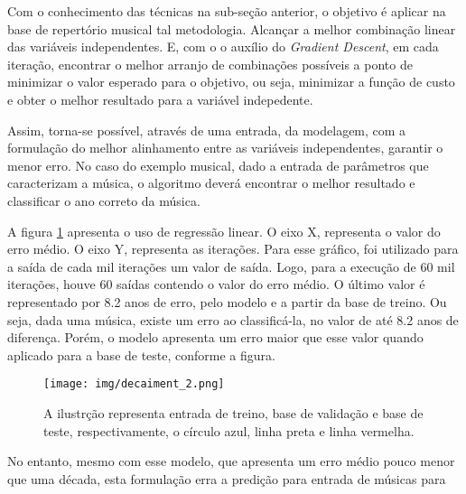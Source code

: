 \documentclass[journal]{IEEEtran}
\begin{document}
Com o conhecimento das técnicas na sub-seção anterior, o objetivo é aplicar na base de repertório musical tal metodologia. Alcançar a melhor combinação linear das variáveis independentes. E, com o o auxílio do \textit{Gradient Descent}, em cada iteração, encontrar o melhor arranjo de combinações possíveis a ponto de minimizar o valor esperado para o objetivo, ou seja, minimizar a função de custo e obter o melhor resultado para a variável indepedente. 

Assim, torna-se possível, através de uma entrada, da modelagem, com a formulação do melhor alinhamento entre as variáveis independentes, garantir o menor erro. No caso do exemplo musical, dado a entrada de parâmetros que caracterizam a música, o algoritmo deverá encontrar o melhor resultado e classificar o ano correto da música.

A figura \ref{fig:decaimento} apresenta o uso de regressão linear. O eixo X, representa o valor do erro médio. O eixo Y, representa as iterações. Para esse gráfico, foi utilizado para a saída de cada mil iterações um valor de saída. Logo, para a execução de 60 mil iterações, houve 60 saídas contendo o valor do erro médio. O último valor é representado por 8.2 anos de erro, pelo modelo e a partir da base de treino. Ou seja, dada uma música, existe um erro ao classificá-la, no valor de até 8.2 anos de diferença. Porém, o modelo apresenta um erro maior que esse valor quando aplicado para a base de teste, conforme a figura.

\begin{figure}[h]
\captionsetup{justification=centering}
\centering
\texttt{[image: img/decaiment\_2.png]} %
\caption{\small{A ilustrção representa entrada de treino, base de validação e base de teste, respectivamente, o círculo azul, linha preta e linha vermelha.}}
\label{fig:decaimento}
\end{figure}

No entanto, mesmo com esse modelo, que apresenta um erro médio pouco menor que uma década, esta formulação erra a predição para entrada de músicas para





\end{document}
